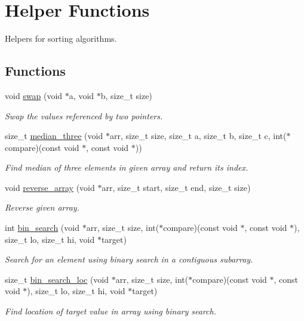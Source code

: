 \hypertarget{group__SortingHelper}{}\section{Helper Functions}
\label{group__SortingHelper}


Helpers for sorting algorithms.  


\subsection*{Functions}
\begin{DoxyCompactItemize}
\item 
void \hyperlink{group__SortingHelper_gac005eaa05ec80dbf1a0984d3d4fa80a8}{swap} (void $\ast$a, void $\ast$b, size\+\_\+t size)
\begin{DoxyCompactList}\small\item\em Swap the values referenced by two pointers. \end{DoxyCompactList}\item 
size\+\_\+t \hyperlink{group__SortingHelper_ga7ca72135e6d6f9e7af0ea60d653efb09}{median\+\_\+three} (void $\ast$arr, size\+\_\+t size, size\+\_\+t a, size\+\_\+t b, size\+\_\+t c, int($\ast$compare)(const void $\ast$, const void $\ast$))
\begin{DoxyCompactList}\small\item\em Find median of three elements in given array and return its index. \end{DoxyCompactList}\item 
void \hyperlink{group__SortingHelper_gae26181b67ffd4261a676f39624c3ce68}{reverse\+\_\+array} (void $\ast$arr, size\+\_\+t start, size\+\_\+t end, size\+\_\+t size)
\begin{DoxyCompactList}\small\item\em Reverse given array. \end{DoxyCompactList}\item 
int \hyperlink{group__SortingHelper_gaf203a2e0f9fe91935ca226e8f038fb43}{bin\+\_\+search} (void $\ast$arr, size\+\_\+t size, int($\ast$compare)(const void $\ast$, const void $\ast$), size\+\_\+t lo, size\+\_\+t hi, void $\ast$target)
\begin{DoxyCompactList}\small\item\em Search for an element using binary search in a contiguous subarray. \end{DoxyCompactList}\item 
\mbox{\label{group__SortingHelper_ga347d3eac5748d59424afd8566181fc27}} 
size\+\_\+t \hyperlink{group__SortingHelper_ga347d3eac5748d59424afd8566181fc27}{bin\+\_\+search\+\_\+loc} (void $\ast$arr, size\+\_\+t size, int($\ast$compare)(const void $\ast$, const void $\ast$), size\+\_\+t lo, size\+\_\+t hi, void $\ast$target)
\begin{DoxyCompactList}\small\item\em Find location of target value in array using binary search. \end{DoxyCompactList}\end{DoxyCompactItemize}


